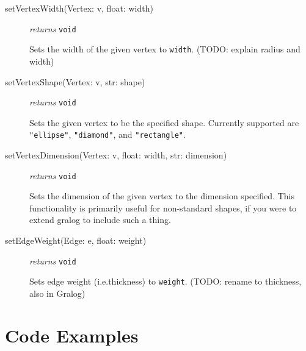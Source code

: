 \documentclass{article}
\begin{document}
\begin{description}
\item[setVertexWidth(Vertex: v, float: width)] \emph{returns}
  \texttt{void}

Sets the width of the given vertex to \texttt{width}. (TODO: explain
radius and width)

\item[setVertexShape(Vertex: v, str: shape)] \emph{returns} \texttt{void}

Sets the given vertex to be the specified shape. Currently supported
are \texttt{"ellipse"}, \texttt{"diamond"}, and \texttt{"rectangle"}.
  
\item[setVertexDimension(Vertex: v, float: width, str: dimension)]
  \emph{returns} \texttt{void}

Sets the dimension of the given vertex to the dimension specified. This functionality is primarily useful for non-standard shapes, if you were to extend gralog to include such a thing.  

\item[setEdgeWeight(Edge: e, float: weight)] \emph{returns} \texttt{void}

Sets edge weight (i.e.\@ thickness) to \texttt{weight}. (TODO: rename
to thickness, also in Gralog)
  
\end{description}

\section{Code Examples}
\end{document}

